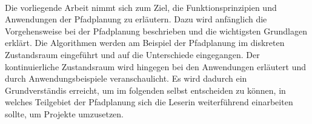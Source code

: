 
\kurzfassung

\paragraph*{}

Die vorliegende Arbeit nimmt sich zum Ziel, die Funktionsprinzipien und Anwendungen der Pfadplanung zu erläutern. Dazu wird anfänglich die Vorgehensweise bei der Pfadplanung beschrieben und die wichtigsten Grundlagen erklärt. Die Algorithmen werden am Beispiel der Pfadplanung im diskreten Zustandsraum eingeführt und auf die Unterschiede eingegangen. Der kontinuierliche Zustandsraum wird hingegen bei den Anwendungen erläutert und durch Anwendungsbeispiele veranschaulicht.
Es wird dadurch ein Grundverständis erreicht, um im folgenden selbst entscheiden zu können, in welches Teilgebiet der Pfadplanung sich die Leserin weiterführend einarbeiten sollte, um Projekte umzusetzen.

